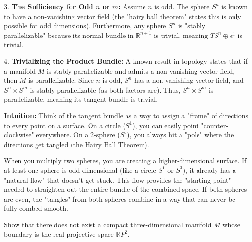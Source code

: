 \begin{solution}
3. \textbf{The Sufficiency for Odd $n$ or $m$:}
Assume $n$ is odd. The sphere $S^n$ is known to have a non-vanishing vector field (the "hairy ball theorem" states this is only possible for odd dimensions). Furthermore, any sphere $S^n$ is "stably parallelizable" because its normal bundle in $\mathbb{R}^{n+1}$ is trivial, meaning $TS^n \oplus \epsilon^1$ is trivial.
\par\vspace{\baselineskip}

4. \textbf{Trivializing the Product Bundle:}
A known result in topology states that if a manifold $M$ is stably parallelizable and admits a non-vanishing vector field, then $M$ is parallelizable. Since $n$ is odd, $S^n$ has a non-vanishing vector field, and $S^n \times S^m$ is stably parallelizable (as both factors are). Thus, $S^n \times S^m$ is parallelizable, meaning its tangent bundle is trivial.
\par\vspace{\baselineskip}

\textbf{Intuition:}
Think of the tangent bundle as a way to assign a "frame" of directions to every point on a surface. On a circle ($S^1$), you can easily point "counter-clockwise" everywhere. On a 2-sphere ($S^2$), you always hit a "pole" where the directions get tangled (the Hairy Ball Theorem).
\par\vspace{\baselineskip}

When you multiply two spheres, you are creating a higher-dimensional surface. If at least one sphere is odd-dimensional (like a circle $S^1$ or $S^3$), it already has a "natural flow" that doesn't get stuck. This flow provides the "starting point" needed to straighten out the entire bundle of the combined space. If both spheres are even, the "tangles" from both spheres combine in a way that can never be fully combed smooth.
\end{solution}

\begin{exercise}
\label{geometry:2015:2}
Show that there does not exist a compact three-dimensional manifold $M$ whose boundary is the real projective space $\mathbb{R}P^{2}$.
\end{exercise}

